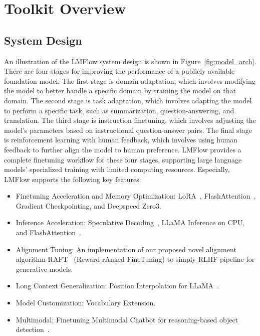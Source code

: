 \documentclass[11pt]{article}
\newcommand{\ModelName}{LMFlow}
\begin{document}
\section{Toolkit Overview}

\subsection{System Design}
An illustration of the LMFlow system design is shown in Figure~\ref{fig:model_arch}.
There are four stages for improving the performance of a publicly available foundation model.
The first stage is domain adaptation, which involves modifying the model to better handle a specific domain by training the model on that domain. 
The second stage is task adaptation, which involves adapting the model to perform a specific task, such as summarization, question-answering, and translation. 
The third stage is instruction finetuning, which involves adjusting the model's parameters based on instructional question-answer pairs. 
The final stage is reinforcement learning with human feedback, which involves using human feedback to further align the model to human preference.
{\ModelName} provides a complete finetuning workflow for these four stages, supporting large language models' specialized training with limited computing resources.
Especially, {\ModelName} supports the following key features:
\begin{itemize}
[leftmargin=*,label=$\bullet$,noitemsep,partopsep=0pt,topsep=0pt,parsep=0pt]
    \item Finetuning Acceleration and Memory Optimization: LoRA~\citep{hulora}, FlashAttention~\citep{dao2022flashattention, dao2023flashattention}, Gradient Checkpointing, and Deepspeed Zero3.
    \item Inference Acceleration: Speculative Decoding~\citep{leviathan2023fast}, LLaMA Inference on CPU, and FlashAttention~\citep{dao2022flashattention, dao2023flashattention}.
    \item Alignment Tuning: An implementation of our proposed novel alignment algorithm RAFT~\citep{dong2023raft} (Reward rAnked FineTuning) to simply RLHF pipeline for generative models. 
    \item Long Context Generalization: Position Interpolation for LLaMA~\citep{chen2023extending}.
    \item Model Customization: Vocabulary Extension.
    \item Multimodal: Finetuning Multimodal Chatbot for reasoning-based object detection~\citep{pi2023detgpt}.
\end{itemize}
\end{document}
